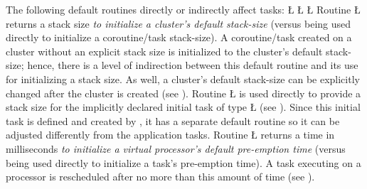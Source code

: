 \documentclass[openright,twoside]{report}
\begin{document}
The following default routines directly or indirectly affect tasks:
\LGinlinefalse\LGbegin\lgrinde
\L{}
\CE{}\L{}
\CE{}\L{}
\CE{}\endlgrinde\LGend
{}%
%
%
%
%
%
%
%
Routine \LGinlinetrue\LGbegin\lgrinde\L{}\endlgrinde\LGend{} returns a stack size \emph{to initialize a cluster's default stack-size} (versus being used directly to initialize a coroutine/task stack-size).
A coroutine/task created on a cluster without an explicit stack size is initialized to the cluster's default stack-size;
hence, there is a level of indirection between this default routine and its use for initializing a stack size.
As well, a cluster's default stack-size can be explicitly changed after the cluster is created (see ).
Routine \LGinlinetrue\LGbegin\lgrinde\L{}\endlgrinde\LGend{} is used directly to provide a stack size for the implicitly declared initial task of type \LGinlinetrue\LGbegin\lgrinde\L{}\endlgrinde\LGend{} (see ).
Since this initial task is defined and created by \uC, it has a separate default routine so it can be adjusted differently from the application tasks.
Routine \LGinlinetrue\LGbegin\lgrinde\L{}\endlgrinde\LGend{} returns a time in milliseconds \emph{to initialize a virtual processor's default pre-emption time} (versus being used directly to initialize a task's pre-emption time).
A task executing on a processor is rescheduled after no more than this amount of time (see ).
\end{document}
